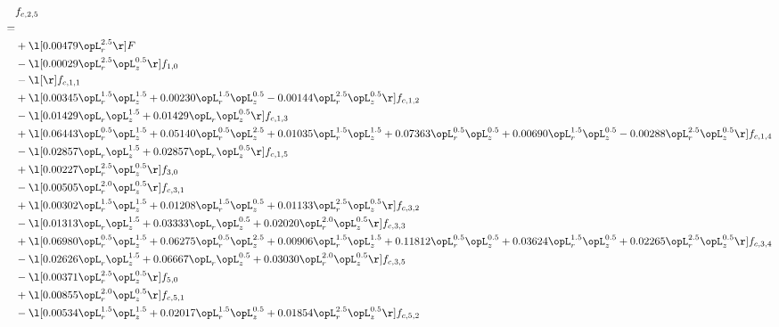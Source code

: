 \begin{alignat}{2} 
\label{eq:f_25_1} 
& f_{c,2,5} \nonumber \\ 
 = \\ 
& + \l[  0.00479 \opL_r^{2.5}  \r] F \nonumber \\ 
& - \l[  0.00029 \opL_r^{2.5} \opL_z^{0.5}  \r] f_{1,0} \nonumber \\ 
& - \l[  \r] f_{c,1,1} \nonumber \\ 
& + \l[  0.00345 \opL_r^{1.5} \opL_z^{1.5} +  0.00230 \opL_r^{1.5} \opL_z^{0.5}   -0.00144 \opL_r^{2.5} \opL_z^{0.5}  \r] f_{c,1,2} \nonumber \\ 
& - \l[  0.01429 \opL_r \opL_z^{1.5} +  0.01429 \opL_r \opL_z^{0.5}  \r] f_{c,1,3} \nonumber \\ 
& + \l[  0.06443 \opL_r^{0.5} \opL_z^{1.5} +  0.05140 \opL_r^{0.5} \opL_z^{2.5} +  0.01035 \opL_r^{1.5} \opL_z^{1.5} +  0.07363 \opL_r^{0.5} \opL_z^{0.5} +  0.00690 \opL_r^{1.5} \opL_z^{0.5}   -0.00288 \opL_r^{2.5} \opL_z^{0.5}  \r] f_{c,1,4} \nonumber \\ 
& - \l[  0.02857 \opL_r \opL_z^{1.5} +  0.02857 \opL_r \opL_z^{0.5}  \r] f_{c,1,5} \nonumber \\ 
& + \l[  0.00227 \opL_r^{2.5} \opL_z^{0.5}  \r] f_{3,0} \nonumber \\ 
& - \l[  0.00505 \opL_r^{2.0} \opL_z^{0.5}  \r] f_{c,3,1} \nonumber \\ 
& + \l[  0.00302 \opL_r^{1.5} \opL_z^{1.5} +  0.01208 \opL_r^{1.5} \opL_z^{0.5} +  0.01133 \opL_r^{2.5} \opL_z^{0.5}  \r] f_{c,3,2} \nonumber \\ 
& - \l[  0.01313 \opL_r \opL_z^{1.5} +  0.03333 \opL_r \opL_z^{0.5} +  0.02020 \opL_r^{2.0} \opL_z^{0.5}  \r] f_{c,3,3} \nonumber \\ 
& + \l[  0.06980 \opL_r^{0.5} \opL_z^{1.5} +  0.06275 \opL_r^{0.5} \opL_z^{2.5} +  0.00906 \opL_r^{1.5} \opL_z^{1.5} +  0.11812 \opL_r^{0.5} \opL_z^{0.5} +  0.03624 \opL_r^{1.5} \opL_z^{0.5} +  0.02265 \opL_r^{2.5} \opL_z^{0.5}  \r] f_{c,3,4} \nonumber \\ 
& - \l[  0.02626 \opL_r \opL_z^{1.5} +  0.06667 \opL_r \opL_z^{0.5} +  0.03030 \opL_r^{2.0} \opL_z^{0.5}  \r] f_{c,3,5} \nonumber \\ 
& - \l[  0.00371 \opL_r^{2.5} \opL_z^{0.5}  \r] f_{5,0} \nonumber \\ 
& + \l[  0.00855 \opL_r^{2.0} \opL_z^{0.5}  \r] f_{c,5,1} \nonumber \\ 
& - \l[  0.00534 \opL_r^{1.5} \opL_z^{1.5} +  0.02017 \opL_r^{1.5} \opL_z^{0.5} +  0.01854 \opL_r^{2.5} \opL_z^{0.5}  \r] f_{c,5,2} \nonumber \\ 

\end{alignat}
